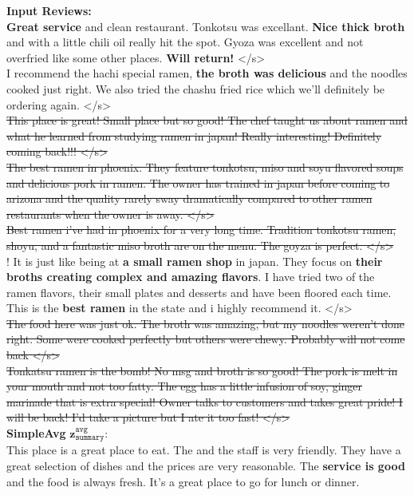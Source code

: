 \documentclass[11pt]{article}
\newcommand{\gray}[1]{{\color[HTML]{808080} \sout{#1}}}
\newcommand\two[1]{\textcolor{c2}{\textbf{#1}}}
\newcommand\three[1]{\textcolor{c3}{\textbf{#1}}}
\newcommand\four[1]{\textcolor{c4}{\textbf{#1}}}
\newcommand\five[1]{\textcolor{c5}{\textbf{#1}}}
\newcommand\six[1]{\textcolor{c6}{\textbf{#1}}}
\begin{document}
\begin{figure*}[th]
    \small
    \vspace{1em}
    \begin{mdframed}
        \textbf{Input Reviews: }\\
        \two{Great service} and clean restaurant. Tonkotsu was excellant. \five{Nice thick broth} and with a little chili oil really hit the spot. Gyoza was excellent and not overfried like some other places. \six{Will return!} </s> \\
        I recommend the hachi special ramen, \five{the broth was delicious} and the noodles cooked just right. We also tried the chashu fried rice which we'll definitely be ordering again. </s>\\
        \gray{This place is great! Small place but so good! The chef taught us about ramen and what he learned from studying ramen in japan! Really interesting! Definitely coming back!!! </s>}
        \\
        \gray{The best ramen in phoenix. They feature tonkotsu, miso and soyu flavored soups and delicious pork in ramen. The owner has trained in japan before coming to arizona and the quality rarely sway dramatically compared to other ramen restaurants when the owner is away. </s>} \\ 
        \gray{Best ramen i've had in phoenix for a very long time. Tradition tonkotsu ramen, shoyu, and a fantastic miso broth are on the menu. The goyza is perfect. </s>}\\ 
        ! It is just like being at \three{a small ramen shop} in japan. They focus on \five{their broths creating complex and amazing flavors}. I have tried two of the ramen flavors, their small plates and desserts and have been floored each time. This is the \four{best ramen} in the state and i highly recommend it. </s>\\ 
        \gray{The food here was just ok. The broth was amazing, but my noodles weren't done right. Some were cooked perfectly but others were chewy. Probably will not come back </s>}\\
        \gray{Tonkatsu ramen is the bomb! No msg and broth is so good! The pork is melt in your mouth and not too fatty. The egg has a little infusion of soy, ginger marinade that is extra special! Owner talks to customers and takes great pride! I will be back! I'd take a picture but I ate it too fast! </s> }\\
        

        \textbf{SimpleAvg} $\boldsymbol{z}_{\texttt{summary}}^{\texttt{avg}}$:\\
        This place is a great place to eat. The  and the staff is very friendly. They have a great selection of dishes and the prices are very reasonable. The \two{service is good} and the food is always fresh. It's a great place to go for lunch or dinner.\\
        

\end{mdframed}
\end{figure*}
\end{document}
